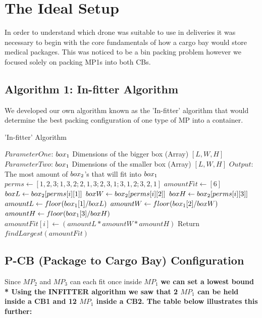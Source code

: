 \documentclass[a4paper,12pt]{article}
\begin{document}
\section{The Ideal Setup}

In order to understand which drone was suitable to use in deliveries it was necessary to begin with the core fundamentals
of how a cargo bay would store medical packages. This was noticed to be a bin packing problem however we focused solely on packing MP1s into both CBs.

\subsection{Algorithm 1: In-fitter Algorithm}
We developed our own algorithm known as the 'In-fitter' algorithm that would determine the best packing configuration of one type of MP into a container.

\begin{algorithm}
  \caption{'In-fitter' Algorithm }
  \label{array-sum}
  \begin{algorithmic}[1]
    \State $ParameterOne$: $box\textsubscript{1}$ Dimensions of the bigger box (Array) $[L, W, H]$
    \State $ParameterTwo$: $box\textsubscript{1}$ Dimensions of the smaller box (Array) $[L, W, H]$
    \State $Output$: The most amount of $box\textsubscript{2}$'s that will fit into $box\textsubscript{1}$
    \State
    \State $perms \leftarrow [1,2,3;1,3,2;2,1,3;2,3,1;3,1,2;3,2,1]$
    \State $amountFit \leftarrow [6] $
    \State $boxL \leftarrow box\textsubscript{2}[perms[i][1]] $ 
    \State $boxW \leftarrow box\textsubscript{2}[perms[i][2]] $
    \State $boxH \leftarrow box\textsubscript{2}[perms[i][3]] $
    \State
    \State $amountL \leftarrow floor( box\textsubscript{1}[1]/boxL )$
    \State $amountW \leftarrow floor( box\textsubscript{1}[2]/boxW )$
    \State $amountH \leftarrow floor( box\textsubscript{1}[3]/boxH )$
    \State $amountFit[i] \leftarrow (amountL * amountW * amountH)$
    \EndFor
    \State Return $findLargest(amountFit)$
    \EndProcedure
  \end{algorithmic}
\end{algorithm}


\subsection{P-CB (Package to Cargo Bay) Configuration}
Since $MP_2$ and $MP_3$ can each fit once inside $MP_1$ \bf{we can set a lowest bound} \\*
Using the INFITTER algorithm we saw that 2 $MP_1$ can be held inside a CB1 and 12 $MP_1$ inside a CB2.  The table below illustrates this further:
\end{document}
